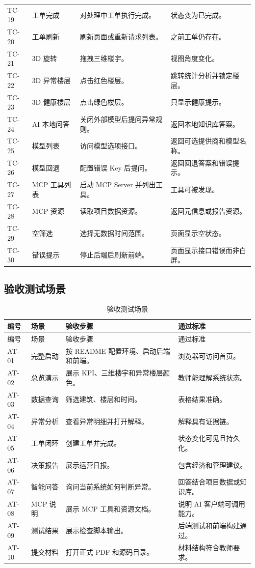 \documentclass[12pt,a4paper]{ctexart}
\begin{document}
\begin{longtable}{L{1.6cm}L{3.0cm}L{5.6cm}L{4.8cm}}
TC-19 & 工单完成 & 对处理中工单执行完成。 & 状态变为已完成。 \\
TC-20 & 工单刷新 & 刷新页面或重新请求列表。 & 之前工单仍存在。 \\
TC-21 & 3D 旋转 & 拖拽三维楼宇。 & 视图角度变化。 \\
TC-22 & 3D 异常楼层 & 点击红色楼层。 & 跳转统计分析并锁定楼层。 \\
TC-23 & 3D 健康楼层 & 点击绿色楼层。 & 只显示健康提示。 \\
TC-24 & AI 本地问答 & 关闭外部模型后提问异常规则。 & 返回本地知识库答案。 \\
TC-25 & 模型列表 & 访问模型选项接口。 & 返回可选提供商和模型名称。 \\
TC-26 & 模型回退 & 配置错误 Key 后提问。 & 返回回退答案和错误提示。 \\
TC-27 & MCP 工具列表 & 启动 MCP Server 并列出工具。 & 工具可被发现。 \\
TC-28 & MCP 资源 & 读取项目数据资源。 & 返回元信息或报告资源。 \\
TC-29 & 空筛选 & 选择无数据时间范围。 & 页面显示空状态。 \\
TC-30 & 错误提示 & 停止后端后刷新前端。 & 页面显示接口错误而非白屏。 \\
\bottomrule
\end{longtable}

\subsection{验收测试场景}
\begin{longtable}{L{1.6cm}L{3.2cm}L{6.0cm}L{4.2cm}}
\caption{验收测试场景}\\
\toprule
编号 & 场景 & 验收步骤 & 通过标准 \\
\midrule
\endfirsthead
\toprule
编号 & 场景 & 验收步骤 & 通过标准 \\
\midrule
\endhead
AT-01 & 完整启动 & 按 README 配置环境、启动后端和前端。 & 浏览器可访问首页。 \\
AT-02 & 总览演示 & 展示 KPI、三维楼宇和异常楼层颜色。 & 教师能理解系统状态。 \\
AT-03 & 数据查询 & 筛选建筑、楼层和时间。 & 表格结果准确。 \\
AT-04 & 异常分析 & 查看异常明细并打开解释。 & 解释具有证据链。 \\
AT-05 & 工单闭环 & 创建工单并完成。 & 状态变化可见且持久化。 \\
AT-06 & 决策报告 & 展示运营日报。 & 包含经济和管理建议。 \\
AT-07 & 智能问答 & 询问当前系统如何判断异常。 & 回答结合项目数据或知识库。 \\
AT-08 & MCP 说明 & 展示 MCP 工具和资源文档。 & 说明 AI 客户端可调用能力。 \\
AT-09 & 测试结果 & 展示检查脚本输出。 & 后端测试和前端构建通过。 \\
AT-10 & 提交材料 & 打开正式 PDF 和源码目录。 & 材料结构符合教师要求。 \\
\bottomrule
\end{longtable}
\end{document}
